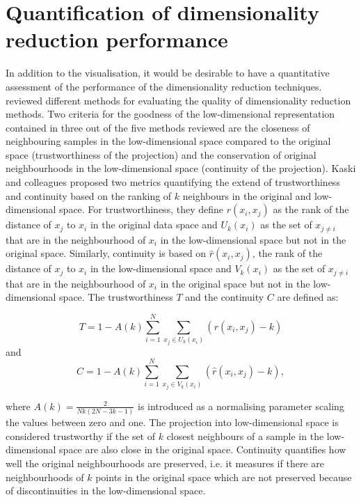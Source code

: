 \section{Quantification of dimensionality reduction performance}
\label{section:Quantification-DimRed}
In addition to the visualisation, it would be desirable to have a quantitative assessment of the performance of the dimensionality reduction techniques. \citet{Lee2009} reviewed different methods for evaluating the quality of dimensionality reduction methods. Two criteria for the goodness of the low-dimensional representation contained in three out of the five methods reviewed are the closeness of neighbouring samples in the low-dimensional space compared to the original space (trustworthiness of the projection) and the conservation of original neighbourhoods in the low-dimensional space (continuity of the projection). Kaski and colleagues \citep{Kaski2003} proposed two metrics quantifying the extend of trustworthiness and continuity based on the ranking of \(k\) neighbours in the original and low-dimensional space. For trustworthiness, they define \(r(x_i, x_j)\) as the rank of the distance of \(x_j\) to  \(x_i\) in the original data space and \(U_k(x_i)\) as the set of \(x_{j \neq i}\) that are in the neighbourhood of \(x_i\) in the low-dimensional space but not in the original space. Similarly, continuity is based on \(\hat{r}(x_i, x_j)\), the rank of the distance of \(x_j\) to  \(x_i\) in the low-dimensional space and \(V_k(x_i)\) as the set of \(x_{j \neq i}\) that are in the neighbourhood of \(x_i\) in the original space but not in the low-dimensional space. The trustworthiness \(T\) and the continuity \(C\) are defined as:

\begin{equation}
T =  1- A(k)\sum^{N}_{i=1}\sum^{}_{x_j \in U_k(x_i)}(r(x_i, x_j) - k)
\label{eq:trustworthiness}
\end{equation}
and 
\begin{equation}
C =  1- A(k)\sum^{N}_{i=1}\sum^{}_{x_j \in V_k(x_i)}(\hat{r}(x_i, x_j) - k),
\label{eq:continuity}
\end{equation}

where \(A(k) = \frac{2}{Nk(2N -3k -1)}\) is introduced as a normalising parameter scaling the values between zero and one. The projection into low-dimensional space is considered trustworthy if the set of \(k\) closest neighbours of a sample in the low-dimensional space are also close in the original space. Continuity quantifies how well the original neighbourhoods are preserved, i.e. it measures if there are neighbourhoods of \(k\) points in the original space which are not preserved because of discontinuities in the low-dimensional space. 

